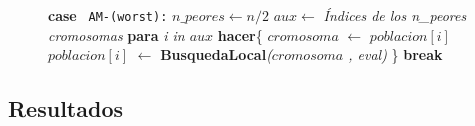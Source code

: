 \begin{figure}[H]
\begin{minipage}{.9\linewidth}
\begin{algorithm}[H]
{				
				\hfill \break 
				\text{ } \textbf{case} \texttt{ AM-(worst):} \break 
				\text{  } \hspace{0.3cm} $n\_peores \leftarrow n/2$ \;
				\text{  } \hspace{0.5cm} $aux \leftarrow$ \textit{Índices de los n\_peores cromosomas}\; \break
				\text{  } \hspace{0.5cm} \textbf{para} \textit{i in $aux$} \textbf{hacer}\{ \break
				\text{  } \hspace{0.8cm} $cromosoma$ $\leftarrow$ $poblacion[i]$ \;
				\text{  } \hspace{1cm} $poblacion[i]$ $\leftarrow$ \textbf{BusquedaLocal}\textit{($cromosoma$ , eval)}\;
				\text{  } \hspace{0.5cm} \} \break
				\text{} \hspace{0.4cm} \textbf{break} \;

				
				
			}
			
		\end{algorithm} 
		
	\end{minipage}
\end{figure}



\newpage

\subsection{Resultados}




